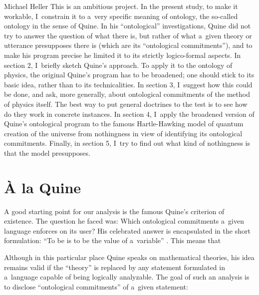 \begin{artengenv}{Michael Heller}
This is an ambitious project. In the present study, to make it workable, I~constrain it to a~very specific meaning
of ontology, the so-called ontology in the sense of Quine. In his ``ontological'' investigations, Quine did not try to
answer the question of what there is, but rather of what a~given theory or utterance presupposes there is (which are
its ``ontological commitments''), and to make his program precise he limited it to its strictly logico-formal aspects. In
section 2, I~briefly sketch Quine’s approach. To apply it to the ontology of physics, the original Quine’s program has
to be broadened; one should stick to its basic idea, rather than to its technicalities. In section 3, I~suggest how
this could be done, and ask, more generally, about ontological commitments of the method of physics itself. The best
way to put general doctrines to the test is to see how do they work in concrete instances. In section 4, I~apply the
broadened version of Quine’s ontological program to the famous Hartle-Hawking model of quantum creation of the universe
from nothingness in view of identifying its ontological commitments. Finally, in section 5, I~try to find out what kind
of nothingness is that the model presupposes.

\section{À la Quine}
A good starting point for our analysis is the famous Quine’s criterion of existence. The question he faced was: Which
ontological commitments a~given language enforces on its user? His celebrated answer is encapsulated in the short
formulation: ``To be is to be the value of a~variable'' \parencite[p.~15]{quine_what_1964}. This means that

Although in this particular place Quine speaks on mathematical theories, his idea remains valid if the ``theory'' is
replaced by any statement formulated in a~language capable of being logically analyzable. The goal of such an analysis
is to disclose ``ontological commitments'' of a~given statement:



\end{artengenv}
